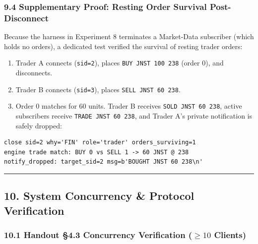\documentclass[
]{article}
\providecommand{\tightlist}{%
  \setlength{\itemsep}{0pt}\setlength{\parskip}{0pt}}
\begin{document}
\hypertarget{supplementary-proof-resting-order-survival-post-disconnect}{%
\subsubsection{9.4 Supplementary Proof: Resting Order Survival
Post-Disconnect}\label{supplementary-proof-resting-order-survival-post-disconnect}}

Because the harness in Experiment 8 terminates a Market-Data subscriber
(which holds no orders), a dedicated test verified the survival of
resting trader orders:

\begin{enumerate}
\def\labelenumi{\arabic{enumi}.}
\tightlist
\item
  Trader A connects (\texttt{sid=2}), places
  \texttt{BUY\ JNST\ 100\ 238} (order 0), and disconnects.
\item
  Trader B connects (\texttt{sid=3}), places
  \texttt{SELL\ JNST\ 60\ 238}.
\item
  Order 0 matches for 60 units. Trader B receives
  \texttt{SOLD\ JNST\ 60\ 238}, active subscribers receive
  \texttt{TRADE\ JNST\ 60\ 238}, and Trader A's private notification is
  safely dropped:
\end{enumerate}

\begin{verbatim}
close sid=2 why='FIN' role='trader' orders_surviving=1
engine trade match: BUY 0 vs SELL 1 -> 60 JNST @ 238
notify_dropped: target_sid=2 msg=b'BOUGHT JNST 60 238\n'
\end{verbatim}

\begin{center}\rule{0.5\linewidth}{0.5pt}\end{center}

\hypertarget{system-concurrency-protocol-verification}{%
\subsection{10. System Concurrency \& Protocol
Verification}\label{system-concurrency-protocol-verification}}

\hypertarget{handout-4.3-concurrency-verification-ge-10-clients}{%
\subsubsection{\texorpdfstring{10.1 Handout §4.3 Concurrency
Verification (\(\ge 10\)
Clients)}{10.1 Handout §4.3 Concurrency Verification (\textbackslash ge 10 Clients)}}\label{handout-4.3-concurrency-verification-ge-10-clients}}
\end{document}

